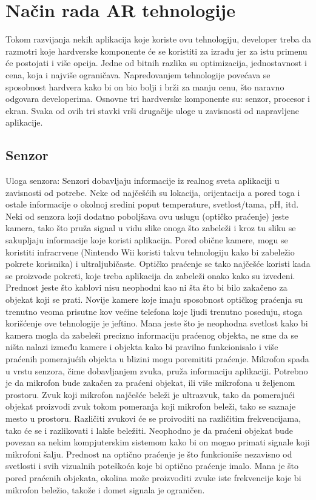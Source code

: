\documentclass[a4paper]{article}
\begin{document}
	\section{Način rada AR tehnologije}
	\label{sec:Način rada AR tehnologije}
    Tokom razvijanja nekih aplikacija koje koriste ovu tehnologiju, developer treba da razmotri koje hardverske komponente će se koristiti za izradu jer za istu primenu će postojati i više opcija. Jedne od bitnih razlika su optimizacija, jednostavnost i cena, koja i najviše ograničava. Napredovanjem tehnologije povećava se sposobnost hardvera kako bi on bio bolji i brži za manju cenu, što naravno odgovara developerima.
	Osnovne tri hardverske komponente su: senzor, procesor i ekran. Svaka od ovih tri stavki vrši drugačije uloge u zavisnosti od napravljene aplikacije.
	\subsection{Senzor}
    \label{sec:Senzor}
    Uloga senzora: Senzori dobavljaju informacije iz realnog sveta aplikaciji u zavisnosti od potrebe. Neke od najčešćih su lokacija, orijentacija a pored toga i ostale informacije o okolnoj sredini poput temperature, svetlost/tama, pH, itd.
	Neki od senzora koji dodatno poboljšava ovu uslugu (optičko praćenje) jeste kamera, tako što pruža signal u vidu slike onoga što zabeleži i kroz tu sliku se sakupljaju informacije koje koristi aplikacija. Pored obične kamere, mogu se koristiti infracrvene (Nintendo Wii koristi takvu tehnologiju kako bi zabeležio pokrete korisnika)  i ultraljubičaste. Optičko praćenje se tako najčešće koristi kada se proizvode pokreti, koje treba aplikacija da zabeleži onako kako su izvedeni. Prednost jeste što kablovi nisu neophodni kao ni šta što bi bilo zakačeno za objekat koji se prati.  Novije kamere koje imaju sposobnost optičkog praćenja su trenutno veoma prisutne kov većine telefona koje ljudi trenutno poseduju, stoga korišćenje ove tehnologije je jeftino. Mana jeste što je neophodna svetlost kako bi kamera mogla da zabeleši precizno informaciju praćenog objekta, ne sme da se ništa nalazi između kamere i objekta kako bi pravilno funkcionisalo i više praćenih pomerajućih objekta u blizini mogu poremititi praćenje.
	Mikrofon spada u vrstu senzora, čime dobavljanjem zvuka, pruža informaciju aplikaciji. Potrebno je da mikrofon bude zakačen za praćeni objekat, ili više mikrofona u željenom prostoru. Zvuk koji mikrofon najčešće beleži je ultrazvuk, tako da pomerajući objekat proizvodi zvuk tokom pomeranja koji mikrofon beleži, tako se saznaje mesto u prostoru. Različiti zvukovi će se proivoditi na različitim frekvencijama, tako će se i razlikovati i lakše beležiti. Neophodno je da praćeni objekat bude povezan sa nekim kompjuterskim sistemom kako bi on mogao primati signale koji mikrofoni šalju. Prednost na optično praćenje je što funkcioniše nezavisno od svetlosti i svih vizualnih poteškoća koje bi optično praćenje imalo. Mana je što pored praćenih objekata, okolina može proizvoditi zvuke iste frekvencije koje bi mikrofon beležio,  takože i domet signala je ograničen.
\end{document}
